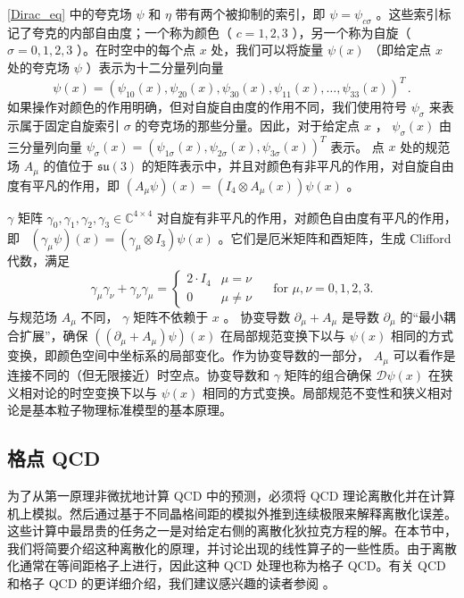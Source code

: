 \documentclass{siamltex}
\newcommand{\Dslash}{\mathcal{D}}
\begin{document}
\eqref{Dirac_eq}    中的夸克场    $\psi$    和    $\eta$    带有两个被抑制的索引，即    $\psi=\psi_{c \sigma}$    。这些索引标记了夸克的内部自由度；一个称为颜色（    $c=1,2,3$    ），另一个称为自旋（    $\sigma=0,1,2,3$    ）。在时空中的每个点    $x$    处，我们可以将旋量    $\psi(x)$    （即给定点    $x$    处的夸克场    $\psi$    ）表示为十二分量列向量
\begin{equation}
  \psi(x)=(\psi_{10}(x),\psi_{20}(x),\psi_{30}(x),\psi_{11}(x),\ldots,\psi_{33}(x))^T\,.
\end{equation}    如果操作对颜色的作用明确，但对自旋自由度的作用不同，我们使用符号    $\psi_\sigma$    来表示属于固定自旋索引    $\sigma$    的夸克场的那些分量。因此，对于给定点
$x$    ，    $\psi_{\sigma}(x)$    由三分量列向量
$\psi_\sigma(x)=(\psi_{1 \sigma}(x),\psi_{2 \sigma}(x),\psi_{3 \sigma}(x))^T$    表示。 点    $x$    处的规范场    $A_\mu$    的值位于    $\mathfrak{su}(3)$    的矩阵表示中，并且对颜色有非平凡的作用，对自旋自由度有平凡的作用，即    $(A_\mu\psi)(x) = (I_4 \otimes
  A_\mu(x))\psi(x)$    。

$\gamma$    矩阵    $\gamma_0,\gamma_1,\gamma_2,\gamma_3 \in  \mathbb{C}^{4
    \times 4}$    对自旋有非平凡的作用，对颜色自由度有平凡的作用，即 \     $(\gamma_\mu\psi)(x) = (\gamma_\mu \otimes I_3)\psi(x)$    。它们是厄米矩阵和酉矩阵，生成 Clifford 代数，满足
\begin{equation} \label{commutativity_rel:eq}
  \gamma_\mu \gamma_\nu + \gamma_\nu \gamma_\mu = \begin{cases} 2 \cdot I_4 &\mu = \nu \\ 0 & \mu \neq \nu \end{cases} \quad \text{ for } \mu,\nu=0,1,2,3.
\end{equation}    与规范场    $A_\mu$    不同，    $\gamma$    矩阵不依赖于    $x$    。
协变导数    $\partial_\mu+A_\mu$    是导数    $\partial_\mu$    的“最小耦合扩展”，确保    $((\partial_\mu+A_\mu)\psi)(x)$    在局部规范变换下以与    $\psi(x)$    相同的方式变换，即颜色空间中坐标系的局部变化。作为协变导数的一部分，    $A_\mu$    可以看作是连接不同的（但无限接近）时空点。协变导数和    $\gamma$    矩阵的组合确保    $\Dslash\psi(x)$    在狭义相对论的时空变换下以与    $\psi(x)$    相同的方式变换。局部规范不变性和狭义相对论是基本粒子物理标准模型的基本原理。
\subsection{格点 QCD  }       \label{lattice_qcd}    为了从第一原理非微扰地计算 QCD 中的预测，必须将 QCD 理论离散化并在计算机上模拟。然后通过基于不同晶格间距的模拟外推到连续极限来解释离散化误差。这些计算中最昂贵的任务之一是对给定右侧的离散化狄拉克方程的解。在本节中，我们将简要介绍这种离散化的原理，并讨论出现的线性算子的一些性质。由于离散化通常在等间距格子上进行，因此这种 QCD 处理也称为格子 QCD。有关 QCD 和格子 QCD 的更详细介绍，我们建议感兴趣的读者参阅    \cite{DeGrand:2006zz, Gattringer:2010zz, montvay1994quantum}    。
\end{document}
